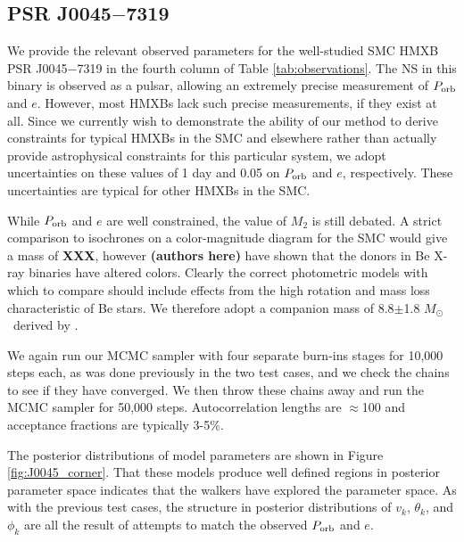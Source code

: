 \documentclass[usenatbib]{mnras}
\newcommand{\Msun}{\ifmmode {M_{\odot}}\else${M_{\odot}}$\fi}
\begin{document}
\subsection{PSR J0045$-$7319}


We provide the relevant observed parameters for the well-studied SMC HMXB PSR J0045$-$7319 in the fourth column of Table \ref{tab:observations}. The NS in this binary is observed as a pulsar, allowing an extremely precise measurement of $P_{\rm orb}$ and $e$. However, most HMXBs lack such precise measurements, if they exist at all. Since we currently wish to demonstrate the ability of our method to derive constraints for typical HMXBs in the SMC and elsewhere rather than actually provide astrophysical constraints for this particular system, we adopt uncertainties on these values of 1 day and 0.05 on $P_{\rm orb}$ and $e$, respectively. These uncertainties are typical for other HMXBs in the SMC. 

While $P_{\rm orb}$ and $e$ are well constrained, the value of $M_2$ is still debated. A strict comparison to isochrones on a color-magnitude diagram for the SMC would give a mass of {\bf XXX}, however {\bf (authors here)} have shown that the donors in Be X-ray binaries have altered colors. Clearly the correct photometric models with which to compare should include effects from the high rotation and mass loss characteristic of Be stars. We therefore adopt a companion mass of 8.8$\pm$1.8 \Msun\ derived by \citet{bell95}.

We again run our MCMC sampler with four separate burn-ins stages for 10,000 steps each, as was done previously in the two test cases, and we check the chains to see if they have converged. We then throw these chains away and run the MCMC sampler for 50,000 steps. Autocorrelation lengths are $\approx$100 and acceptance fractions are typically 3-5\%. 

The posterior distributions of model parameters are shown in Figure \ref{fig:J0045_corner}. That these models produce well defined regions in posterior parameter space indicates that the walkers have explored the parameter space. As with the previous test cases, the structure in posterior distributions of $v_k$, $\theta_k$, and $\phi_k$ are all the result of attempts to match the observed $P_{\rm orb}$ and $e$. 
\end{document}
